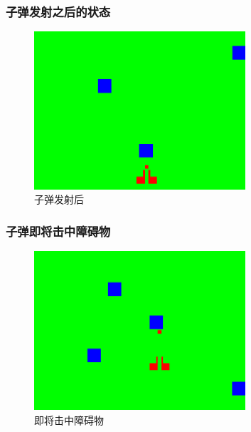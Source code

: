 \subsubsection{子弹发射之后的状态}
\begin{figure}[H]
  \centering
  \includegraphics[width=0.7\textwidth]{img/shot2.png}
  \caption{子弹发射后
  }\label{fig:shot2}
\end{figure}

\subsubsection{子弹即将击中障碍物}
\begin{figure}[H]
  \centering
  \includegraphics[width=0.7\textwidth]{img/shot3.png}
  \caption{即将击中障碍物
  }\label{fig:shot3}
\end{figure}

